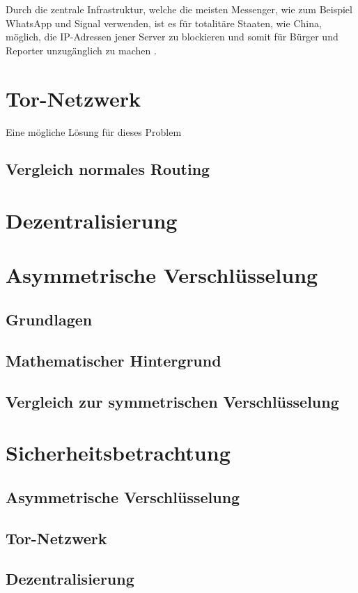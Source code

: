 \documentclass[a4paper,ngerman, headheight=28pt,12pt]{scrartcl}
\newcommand{\vcite}[1]{\cite[vgl.][]{#1}}
\begin{document}
Durch die zentrale Infrastruktur, welche die meisten Messenger, wie zum Beispiel WhatsApp und Signal verwenden, ist es für totalitäre Staaten, wie China, möglich, die IP-Adressen jener Server zu blockieren und somit für Bürger und Reporter unzugänglich zu machen \vcite{ChinaFirewall}.


\section{Tor-Netzwerk}
Eine mögliche Lösung für dieses Problem
\subsection{Vergleich normales Routing}

\section{Dezentralisierung}

\section{Asymmetrische Verschlüsselung}
\subsection{Grundlagen}
\subsection{Mathematischer Hintergrund}
\subsection{Vergleich zur symmetrischen Verschlüsselung}


\section{Sicherheitsbetrachtung}
\subsection{Asymmetrische Verschlüsselung}
\subsection{Tor-Netzwerk}
\subsection{Dezentralisierung}
\end{document}
